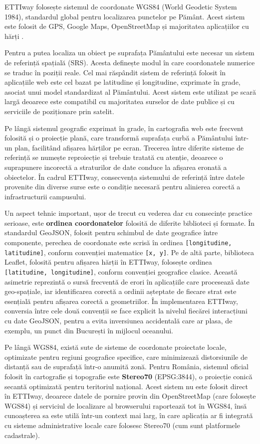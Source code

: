 ETTIway folosește sistemul de coordonate WGS84 (World Geodetic System 1984), standardul global pentru localizarea punctelor pe Pământ. Acest sistem este folosit de GPS, Google Maps, OpenStreetMap și majoritatea aplicațiilor cu hărți .
    

Pentru a putea localiza un obiect pe suprafața Pământului este necesar un sistem
de referință spațială (SRS). Acesta definește modul în care coordonatele numerice
se traduc în poziții reale. Cel mai răspândit sistem de referință folosit în
aplicațiile web este cel bazat pe latitudine și longitudine, exprimate în grade,
asociat unui model standardizat al Pământului. Acest sistem este utilizat pe
scară largă deoarece este compatibil cu majoritatea surselor de date publice și
cu serviciile de poziționare prin satelit\cite{WGS84_UN}.

Pe lângă sistemul geografic exprimat în grade, în cartografia web este frecvent
folosită și o proiecție plană, care transformă suprafața curbă a Pământului
într-un plan, facilitând afișarea hărților pe ecran. Trecerea între diferite
sisteme de referință se numește reproiecție și trebuie tratată cu atenție,
deoarece o suprapunere incorectă a straturilor de date conduce la afișarea
eronată a obiectelor. În cadrul ETTIway, consecvența sistemului de referință
între datele provenite din diverse surse este o condiție necesară pentru
alinierea corectă a infrastructurii campusului.

Un aspect tehnic important, ușor de trecut cu vederea dar cu consecințe practice
serioase, este \textbf{ordinea coordonatelor} folosită de diferite biblioteci și
formate. În standardul GeoJSON, folosit pentru schimbul de date geografice între
componente, perechea de coordonate este scrisă în ordinea
\texttt{[longitudine, latitudine]}, conform convenției matematice
\texttt{[x, y]}. Pe de altă parte, biblioteca Leaflet, folosită pentru afișarea
hărții în ETTIway, folosește ordinea
\texttt{[latitudine, longitudine]}, conform convenției geografice
clasice. Această asimetrie reprezintă o sursă frecventă de erori în
aplicațiile care procesează date geo-spațiale, iar identificarea corectă a
ordinii așteptate de fiecare strat este esențială pentru afișarea corectă a
geometriilor. În implementarea ETTIway, conversia între cele două convenții se
face explicit la nivelul fiecărei interacțiuni cu date GeoJSON, pentru a evita
inversiunea accidentală care ar plasa, de exemplu, un punct din București în
mijlocul oceanului.
 

Pe lângă WGS84, există sute de sisteme de coordonate proiectate locale, optimizate
pentru regiuni geografice specifice, care minimizează distorsiunile de distanță
sau de suprafață într-o anumită zonă. Pentru România, sistemul oficial folosit în
cartografie și topografie este \textbf{Stereo70} (EPSG:3844), o proiecție conică
secantă optimizată pentru teritoriul național\cite{EPSG3844}. Acest sistem nu este folosit
direct în ETTIway, deoarece datele de pornire provin din OpenStreetMap (care
folosește WGS84) și serviciul de localizare al browserului raportează tot în
WGS84, însă cunoașterea sa este utilă într-un context mai larg, în care
aplicația ar fi integrată cu sisteme administrative locale care folosesc
Stereo70 (cum sunt platformele cadastrale).

